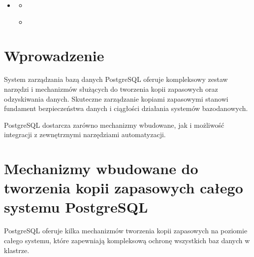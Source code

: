 \documentclass[letterpaper,10pt,polish]{sphinxmanual}
\begin{document}
\begin{sphinxShadowBox}
\begin{itemize}
\begin{itemize}
\end{itemize}

\item {} 
\sphinxAtStartPar
{}\label{\detokenize{kopie_zapasowe_i_odzyskiwanie_danych:id25}}{\hyperref[\detokenize{kopie_zapasowe_i_odzyskiwanie_danych:podsumowanie}]{}}
\begin{itemize}
\item {} 
\sphinxAtStartPar
{}\label{\detokenize{kopie_zapasowe_i_odzyskiwanie_danych:id26}}{\hyperref[\detokenize{kopie_zapasowe_i_odzyskiwanie_danych:kluczowe-wnioski}]{}}

\item {} 
\sphinxAtStartPar
{}\label{\detokenize{kopie_zapasowe_i_odzyskiwanie_danych:id27}}{\hyperref[\detokenize{kopie_zapasowe_i_odzyskiwanie_danych:najwazniejsze-zalecenia}]{}}

\end{itemize}

\end{itemize}
\end{sphinxShadowBox}


\section{Wprowadzenie}
\label{\detokenize{kopie_zapasowe_i_odzyskiwanie_danych:wprowadzenie}}
\sphinxAtStartPar
System zarządzania bazą danych PostgreSQL oferuje kompleksowy zestaw narzędzi i mechanizmów służących do tworzenia kopii zapasowych oraz odzyskiwania danych. Skuteczne zarządzanie kopiami zapasowymi stanowi fundament bezpieczeństwa danych i ciągłości działania systemów bazodanowych.

\sphinxAtStartPar
PostgreSQL dostarcza zarówno mechanizmy wbudowane, jak i możliwość integracji z zewnętrznymi narzędziami automatyzacji.


\section{Mechanizmy wbudowane do tworzenia kopii zapasowych całego systemu PostgreSQL}
\label{\detokenize{kopie_zapasowe_i_odzyskiwanie_danych:mechanizmy-wbudowane-do-tworzenia-kopii-zapasowych-calego-systemu-postgresql}}
\sphinxAtStartPar
PostgreSQL oferuje kilka mechanizmów tworzenia kopii zapasowych na poziomie całego systemu, które zapewniają kompleksową ochronę wszystkich baz danych w klastrze.
\end{document}
